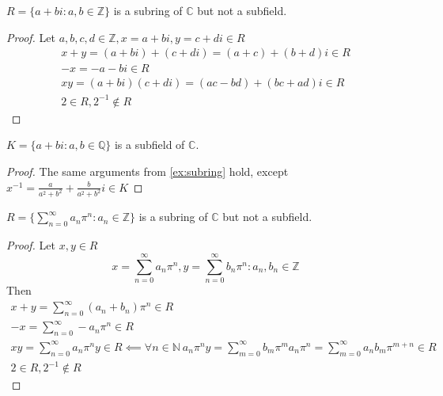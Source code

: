 \documentclass{book}
\begin{document}
    \begin{examples}
    \begin{example} \label{ex:subring}
        \(R = \{a + bi : a,b \in \mathbb{Z}\}\) is a subring of \(\mathbb{C}\) but not a subfield.
    \end{example}
    \begin{proof}
        Let \(a,b,c,d \in \mathbb{Z}, x = a + bi, y = c + di \in R\)
        \begin{equation*}
        \begin{split}
            x + y = (a + bi) + (c + di) = (a + c) + (b + d)i \in R\\
            -x = -a - bi \in R\\
            xy = (a + bi)(c + di) = (ac - bd) + (bc + ad)i \in R\\
            2 \in R, 2^{-1} \notin R
        \end{split}
        \end{equation*}
    \end{proof}

    \begin{example}
        \(K = \{a + bi : a,b \in \mathbb{Q}\}\) is a subfield of \(\mathbb{C}\).
    \end{example}
    \begin{proof}
        The same arguments from \cref{ex:subring} hold, except
        \(x^{-1} = \frac{a}{a^2 + b^2} + \frac{b}{a^2 + b^2}i \in K\)
    \end{proof}

    \begin{example}
        \(R = \{\sum_{n = 0}^\infty a_n\pi^n : a_n \in \mathbb{Z}\}\) is a subring of \(\mathbb{C}\) but not a subfield.
    \end{example}
    \begin{proof}
        Let \(x, y \in R\)
        \[ x = \sum_{n = 0}^\infty a_n\pi^n, y = \sum_{n = 0}^\infty b_n\pi^n : a_n,b_n \in \mathbb{Z}\]
        Then
        \begin{equation*}
        \begin{split}
            x + y = \sum_{n = 0}^\infty (a_n + b_n)\pi^n \in R\\
            -x = \sum_{n = 0}^\infty -a_n\pi^n \in R\\
            xy = \sum_{n = 0}^\infty a_n\pi^ny \in R \impliedby
            \forall n \in \mathbb{N} \ a_n\pi^ny = 
            \sum_{m = 0}^\infty b_m\pi^ma_n\pi^n = 
            \sum_{m = 0}^\infty a_nb_m\pi^{m + n} \in R\\
            2 \in R, 2^{-1} \notin R
        \end{split}
        \end{equation*}
    \end{proof}
    \end{examples}
\end{document}
